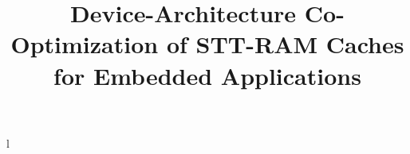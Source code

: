 \documentclass[10pt,letterpaper,conference]{IEEEtran}
\begin{document}
l
\title{Device-Architecture Co-Optimization of STT-RAM Caches for Embedded Applications\vspace{-10pt}}

\maketitle












\end{document}
